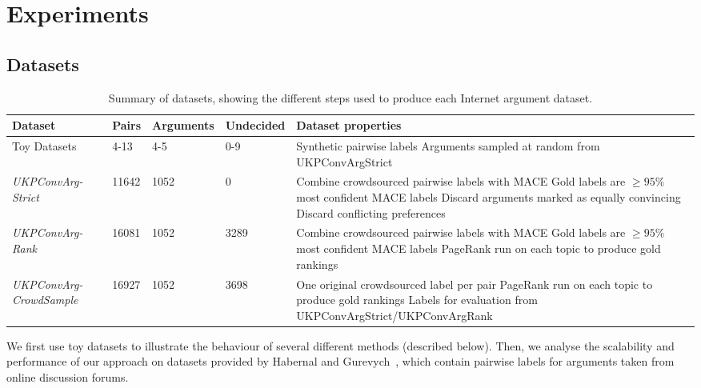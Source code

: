 \section{Experiments}\label{sec:expts}

\subsection{Datasets}
\begin{table}[h]
\small
  \begin{tabularx}{\textwidth}{ p{2.0cm} | p{0.6cm} p{1.2cm} p{1.2cm} X }
  Dataset & Pairs & Arguments & Undecided & Dataset properties \\\hline\hline
  Toy Datasets & 4-13 & 4-5 & 0-9 & Synthetic pairwise labels
  \newline Arguments sampled at random from UKPConvArgStrict\\  
  \hline\emph{UKPConvArg-Strict} &
  11642 &
  1052 & 
  0 &
  Combine crowdsourced pairwise labels with MACE \newline
  Gold labels are $\ge 95\%$ most confident MACE labels \newline
  Discard arguments marked as equally convincing \newline
  Discard conflicting preferences \\
  \hline\emph{UKPConvArg-Rank} &
  16081 &
  1052 &
  3289 &
  Combine crowdsourced pairwise labels with MACE \newline
  Gold labels are $\ge 95\%$ most confident MACE labels \newline
  PageRank run on each topic to produce gold rankings \\  
  \hline\emph{UKPConvArg-CrowdSample} &
  16927 & 
  1052 &
  3698 &
  One original crowdsourced label per pair\newline
  PageRank run on each topic to produce gold rankings \newline
  Labels for evaluation from UKPConvArgStrict/UKPConvArgRank
  \end{tabularx}
  \caption{\label{tab:expt_data} Summary of datasets, showing the different steps used to produce each Internet argument dataset.}
\end{table}
We first use toy datasets to illustrate the behaviour of several different methods (described below).
Then, 
we analyse the scalability and performance of our approach on datasets provided by Habernal and Gurevych~,
which contain pairwise labels for arguments taken from online discussion forums.
